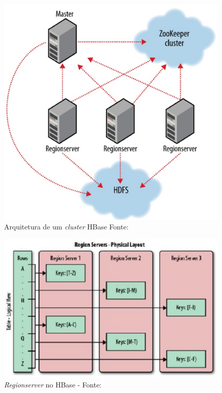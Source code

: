             \begin{figure}[ht!]
                        \centering
                        \includegraphics[keepaspectratio=true,scale=0.5]
                            {figuras/figura11.eps}
                        \caption[Arquitetura de um \textit{cluster} HBase]{Arquitetura de um \textit{cluster} HBase
                        \protect \linebreak Fonte: }
                        \label{figura11}
            \end{figure}

            \begin{figure}[ht!]
                        \centering
                        \includegraphics[keepaspectratio=true,scale=0.7]
                            {figuras/figura12.eps}
                        \caption[\textit{Regionserver} no HBase]{\textit{Regionserver} no HBase -
                        \protect Fonte: }
                        \label{figura12}
            \end{figure}


